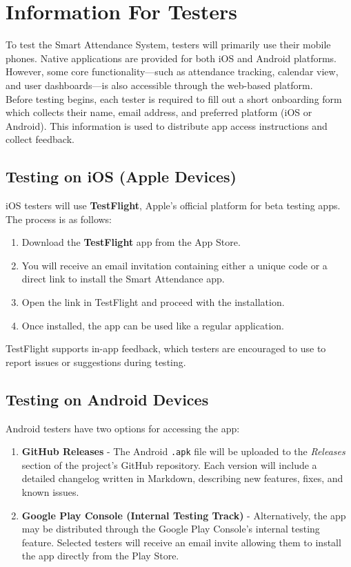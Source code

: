 \documentclass[a4paper, 12pt]{article}
\begin{document}
  \section{Information For Testers}
    To test the Smart Attendance System, testers will primarily use their mobile phones. Native applications are provided for both iOS and Android platforms. However, some core functionality—such as attendance tracking, calendar view, and user dashboards—is also accessible through the web-based platform. \\

    Before testing begins, each tester is required to fill out a short onboarding form which collects their name, email address, and preferred platform (iOS or Android). This information is used to distribute app access instructions and collect feedback.

  \subsection{Testing on iOS (Apple Devices)}

    iOS testers will use \textbf{TestFlight}, Apple's official platform for beta testing apps. The process is as follows:

    \begin{enumerate}
      \item Download the \textbf{TestFlight} app from the App Store.
      \item You will receive an email invitation containing either a unique code or a direct link to install the Smart Attendance app.
      \item Open the link in TestFlight and proceed with the installation.
      \item Once installed, the app can be used like a regular application.
    \end{enumerate}

    TestFlight supports in-app feedback, which testers are encouraged to use to report issues or suggestions during testing.

  \subsection{Testing on Android Devices}

    Android testers have two options for accessing the app:

    \begin{enumerate}
      \item \textbf{GitHub Releases} - The Android \texttt{.apk} file will be uploaded to the \emph{Releases} section of the project's GitHub repository. Each version will include a detailed changelog written in Markdown, describing new features, fixes, and known issues.
      \item \textbf{Google Play Console (Internal Testing Track)} - Alternatively, the app may be distributed through the Google Play Console's internal testing feature. Selected testers will receive an email invite allowing them to install the app directly from the Play Store.
    \end{enumerate}
\end{document}
